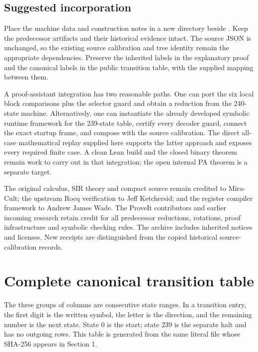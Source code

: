 \documentclass[11pt,a4paper]{article}
\newcommand{\file}[1]{\texttt{\detokenize{#1}}}
\begin{document}
\subsection{Suggested incorporation}

Place the machine data and construction notes in a new
\file{candidate-delayed239} directory beside
\file{candidate-rotation240}. Keep the predecessor artifacts and their
historical evidence intact. The source JSON is unchanged, so the existing
source calibration and tree identity remain the appropriate dependencies.
Preserve the inherited labels in the explanatory proof and the canonical
labels in the public transition table, with the supplied mapping between
them.

A proof-assistant integration has two reasonable paths. One can port
the six local block comparisons plus the selector guard and obtain a
reduction from the 240-state machine. Alternatively, one can instantiate
the already developed symbolic runtime framework for the 239-state
table, certify every decoder guard, connect the exact startup frame,
and compose with the source calibration. The direct all-case mathematical
replay supplied here supports the latter approach and exposes every
required finite case. A clean Lean build and the closed binary theorem
remain work to carry out in that integration; the open internal PA
theorem is a separate target.

The original calculus, SIR theory and compact source remain credited to
Mira-Cult; the upstream Rocq verification to Jeff Ketchersid; and the
register compiler framework to Andrew James Wade. The ProveIt contributors
and earlier incoming research retain credit for all predecessor reductions,
rotations, proof infrastructure and symbolic checking rules. The archive
includes inherited notices and licenses. New receipts are distinguished
from the copied historical source-calibration records.

\appendix


\section{Complete canonical transition table}
\label{app:table}

The three groups of columns are consecutive state ranges. In a transition
entry, the first digit is the written symbol, the letter is the direction,
and the remaining number is the next state. State 0 is the start; state
239 is the separate halt and has no outgoing rows. This table is generated
from the same literal file whose SHA-256 appears in Section 1.
\end{document}
